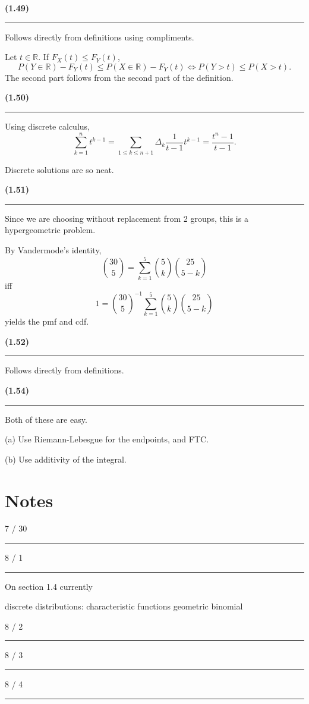 \documentclass[12pt, reqno]{amsart}
\numberwithin{equation}{section}
\newcommand{\R}{\mathbb{R}}
\begin{document}
{\bf (1.49) \rule{\textwidth}{.5pt}}

Follows directly from definitions using compliments.

Let $t \in \R.$
If $F_X(t) \le F_Y(t)$,
\[
P(Y \in \R) - F_Y(t) \le P(X \in \R) - F_Y(t)
\iff P(Y > t) \le P(X > t).
\]
The second part follows from the second part of the definition.

{\bf (1.50) \rule{\textwidth}{.5pt}}

Using discrete calculus,
\[
\sum_{k = 1}^n t^{k - 1}
= \sum_{1 \le k \le n + 1} \Delta_k \frac{1}{t - 1}  t^{k - 1}
= \frac{t^n - 1}{t - 1}.
\]

Discrete solutions are so neat.

{\bf (1.51) \rule{\textwidth}{.5pt}}

Since we are choosing without replacement from 2 groups, this is a hypergeometric problem.

By Vandermode's identity,
\[
\binom{30} {5}
= \sum_{k = 1}^5 \binom{5}{k} \binom{25}{5 - k}
\]
iff
\[
1
= \binom{30} {5}^{-1} \sum_{k = 1}^5 \binom{5}{k} \binom{25}{5 - k}
\]
yields the pmf and cdf.

{\bf (1.52) \rule{\textwidth}{.5pt}}

Follows directly from definitions.

{\bf (1.54) \rule{\textwidth}{.5pt}}

Both of these are easy.

(a) Use Riemann-Lebesgue for the endpoints, and FTC.

(b) Use additivity of the integral.













\section*{Notes}

7 / 30
\rule{\textwidth}{.5pt}

8 / 1
\rule{\textwidth}{.5pt}

On section 1.4 currently

discrete distributions:
characteristic functions
geometric
binomial

8 / 2
\rule{\textwidth}{.5pt}


8 / 3
\rule{\textwidth}{.5pt}

8 / 4
\rule{\textwidth}{.5pt}
\end{document}
